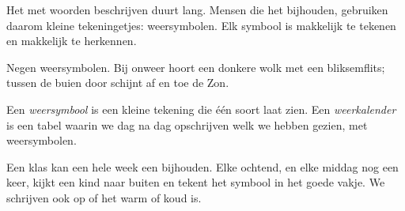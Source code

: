 Het  met woorden beschrijven duurt lang. Mensen die het 
bijhouden, gebruiken daarom kleine tekeningetjes: weersymbolen. Elk
symbool is makkelijk te tekenen en makkelijk te herkennen.

\begin{omfigure}

{\small Negen weersymbolen. Bij onweer hoort een donkere wolk met een
bliksemflits; tussen de buien door schijnt af en toe de Zon.}
\end{omfigure}

\begin{definition}[Weerkalender]\label{def:g1:watching-the-weather:weather-chart}
Een \emph{weersymbool} is een kleine tekening die één
soort  laat zien. Een \emph{weerkalender} is een
tabel waarin we dag na dag opschrijven welk  we hebben gezien, met
weersymbolen.
\end{definition}

Een klas kan een hele week een  bijhouden. Elke ochtend, en
elke middag nog een keer, kijkt een kind naar buiten en tekent het symbool
in het goede vakje. We schrijven ook op of het warm of koud is.


